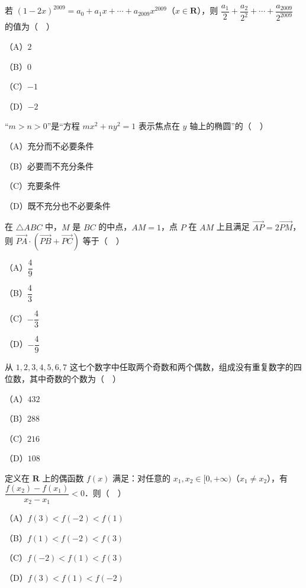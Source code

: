 \begin{question}
若 $(1-2x)^{2009}=a_0+a_1x+\cdots+a_{2009}x^{2009}$（$x\in\mathbf R$），则 $\dfrac{a_1}2+\dfrac{a_2}{2^2}+\cdots+\dfrac{a_{2009}}{2^{2009}}$ 的值为（　）

（A）$2$

（B）$0$

（C）$-1$

（D）$-2$

\end{question}
\begin{question}
“$m>n>0$”是“方程 $mx^2+ny^2=1$ 表示焦点在 $y$ 轴上的椭圆”的（　）

（A）充分而不必要条件

（B）必要而不充分条件

（C）充要条件

（D）既不充分也不必要条件

\end{question}
\begin{question}
在 $\triangle ABC$ 中，$M$ 是 $BC$ 的中点，$AM=1$，点 $P$ 在 $AM$ 上且满足 $\overrightarrow{AP}=2\overrightarrow{PM}$，则 $\overrightarrow{PA}\cdot(\overrightarrow{PB}+\overrightarrow{PC})$ 等于（　）

（A）$\dfrac49$

（B）$\dfrac43$

（C）$-\dfrac43$

（D）$-\dfrac49$

\end{question}
\begin{question}
从 $1,2,3,4,5,6,7$ 这七个数字中任取两个奇数和两个偶数，组成没有重复数字的四位数，其中奇数的个数为（　）

（A）$432$

（B）$288$

（C）$216$

（D）$108$

\end{question}
\begin{question}
定义在 $\mathbf R$ 上的偶函数 $f(x)$ 满足：对任意的 $x_1,x_2\in[0,+\infty)$（$x_1\neq x_2$），有 $\dfrac{f(x_2)-f(x_1)}{x_2-x_1}<0$．则（　）

（A）$f(3)<f(-2)<f(1)$

（B）$f(1)<f(-2)<f(3)$

（C）$f(-2)<f(1)<f(3)$

（D）$f(3)<f(1)<f(-2)$

\end{question}
